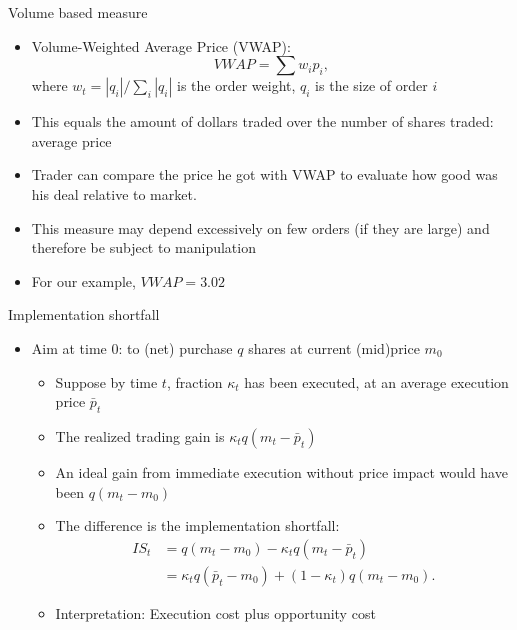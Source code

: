 \documentclass[english,10pt
,aspectratio=169
]{beamer}
\begin{document}
\begin{frame}{Volume based measure}
\begin{itemize}
	\item \alert{Volume-Weighted Average Price} (VWAP):
	\[
	VWAP = \sum  w_i p_i,
	\]
	where $w_t = |q_i|/\sum_i |q_i|$ is the order weight, $q_i$ is the size of order $i$
	\item This equals the amount of dollars traded over the number of shares traded: average price
	\item Trader can compare the price he got with VWAP to evaluate how good was his deal relative to market.
	\item This measure may depend excessively on few orders (if they are large) and therefore be subject to manipulation
	\item For our example, $VWAP=3.02$
\end{itemize}
\end{frame}


\begin{frame}{Implementation shortfall}
	\begin{itemize}
		\item Aim at time 0: to (net) purchase $q$ shares at current (mid)price $m_0$
		\begin{itemize}
			\item Suppose by time $t$, fraction $\kappa_t$ has been executed, at an average execution price $\bar{p}_t$
			\item The realized trading gain is $\kappa_t q(m_t-\bar{p}_t)$
			\item An ideal gain from immediate execution without price impact would have been $q(m_t - m_0)$
			\item The difference is the \alert{implementation shortfall}:
			\begin{align*}
			IS_t 
			& = q(m_t-m_0) - \kappa_t q (m_t - \bar{p}_t) \\
			& = \kappa_t q(\bar{p}_t - m_0) + (1-\kappa_t) q (m_t - m_0).
			\end{align*}
			\item Interpretation: Execution cost plus opportunity cost
		\end{itemize}
	\end{itemize}
\end{frame}
\end{document}
